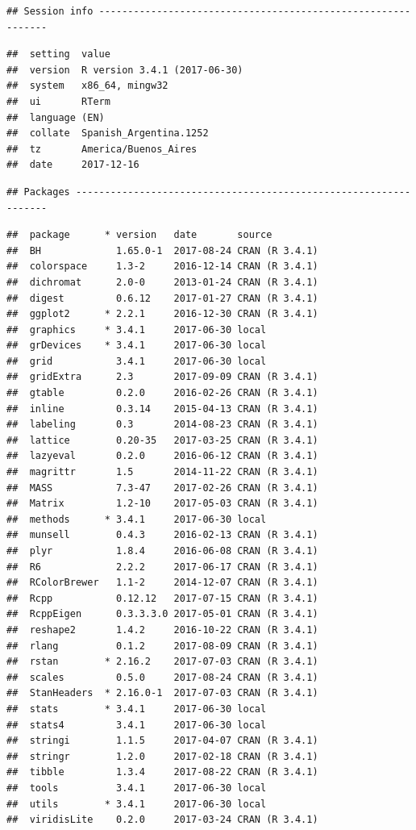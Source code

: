 \documentclass[]{article}
\begin{document}
\begin{verbatim}
## Session info -------------------------------------------------------------
\end{verbatim}

\begin{verbatim}
##  setting  value                       
##  version  R version 3.4.1 (2017-06-30)
##  system   x86_64, mingw32             
##  ui       RTerm                       
##  language (EN)                        
##  collate  Spanish_Argentina.1252      
##  tz       America/Buenos_Aires        
##  date     2017-12-16
\end{verbatim}

\begin{verbatim}
## Packages -----------------------------------------------------------------
\end{verbatim}

\begin{verbatim}
##  package      * version   date       source        
##  BH             1.65.0-1  2017-08-24 CRAN (R 3.4.1)
##  colorspace     1.3-2     2016-12-14 CRAN (R 3.4.1)
##  dichromat      2.0-0     2013-01-24 CRAN (R 3.4.1)
##  digest         0.6.12    2017-01-27 CRAN (R 3.4.1)
##  ggplot2      * 2.2.1     2016-12-30 CRAN (R 3.4.1)
##  graphics     * 3.4.1     2017-06-30 local         
##  grDevices    * 3.4.1     2017-06-30 local         
##  grid           3.4.1     2017-06-30 local         
##  gridExtra      2.3       2017-09-09 CRAN (R 3.4.1)
##  gtable         0.2.0     2016-02-26 CRAN (R 3.4.1)
##  inline         0.3.14    2015-04-13 CRAN (R 3.4.1)
##  labeling       0.3       2014-08-23 CRAN (R 3.4.1)
##  lattice        0.20-35   2017-03-25 CRAN (R 3.4.1)
##  lazyeval       0.2.0     2016-06-12 CRAN (R 3.4.1)
##  magrittr       1.5       2014-11-22 CRAN (R 3.4.1)
##  MASS           7.3-47    2017-02-26 CRAN (R 3.4.1)
##  Matrix         1.2-10    2017-05-03 CRAN (R 3.4.1)
##  methods      * 3.4.1     2017-06-30 local         
##  munsell        0.4.3     2016-02-13 CRAN (R 3.4.1)
##  plyr           1.8.4     2016-06-08 CRAN (R 3.4.1)
##  R6             2.2.2     2017-06-17 CRAN (R 3.4.1)
##  RColorBrewer   1.1-2     2014-12-07 CRAN (R 3.4.1)
##  Rcpp           0.12.12   2017-07-15 CRAN (R 3.4.1)
##  RcppEigen      0.3.3.3.0 2017-05-01 CRAN (R 3.4.1)
##  reshape2       1.4.2     2016-10-22 CRAN (R 3.4.1)
##  rlang          0.1.2     2017-08-09 CRAN (R 3.4.1)
##  rstan        * 2.16.2    2017-07-03 CRAN (R 3.4.1)
##  scales         0.5.0     2017-08-24 CRAN (R 3.4.1)
##  StanHeaders  * 2.16.0-1  2017-07-03 CRAN (R 3.4.1)
##  stats        * 3.4.1     2017-06-30 local         
##  stats4         3.4.1     2017-06-30 local         
##  stringi        1.1.5     2017-04-07 CRAN (R 3.4.1)
##  stringr        1.2.0     2017-02-18 CRAN (R 3.4.1)
##  tibble         1.3.4     2017-08-22 CRAN (R 3.4.1)
##  tools          3.4.1     2017-06-30 local         
##  utils        * 3.4.1     2017-06-30 local         
##  viridisLite    0.2.0     2017-03-24 CRAN (R 3.4.1)
\end{verbatim}
\end{document}
